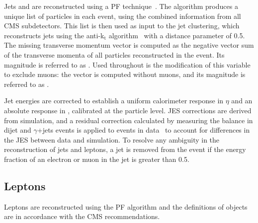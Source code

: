 Jets and \MET are reconstructed using a \ac{PF}
technique~\cite{PFT-09-001}. The algorithm produces a unique list 
of particles in each event, using the combined information from all 
CMS subdetectors. This list is then used as input to the jet 
clustering, which reconstructs jets using the anti-k$_{\mathrm{t}}$
algorithm~\cite{bib:akjets} with a distance parameter of 0.5.  
The missing transverse momentum vector \METv is computed as the negative vector 
sum of the transverse momenta of all particles reconstructed in the 
event.
Its magnitude is referred to as \MET.
Used throughout is the modification of this variable to exclude muons: the vector \METvmu is computed without muons, and its magnitude is referred to as \METmu. 

Jet energies are corrected to establish a uniform calorimeter 
response in $\eta$ and an absolute response in \pt, calibrated at 
the particle level.  
\ac{JES} corrections are derived from simulation, and a residual correction calculated by measuring the \pt balance in dijet and $\gamma$+jets events is applied to events in data~\cite{JETJINST} to account for differences in the \ac{JES} between data and simulation.
To resolve any ambiguity in the reconstruction of jets and leptons, a jet is removed from the event if the energy fraction of an electron or muon in the jet is greater than 0.5.



\subsection{Leptons}
\label{sec:objectReco:lep}

Leptons are reconstructed using the \ac{PF} algorithm and the definitions of objects are in accordance with the \ac{CMS} recommendations.



